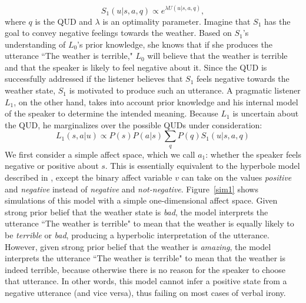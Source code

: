 \documentclass[10pt,letterpaper]{article}
\begin{document}
\begin{equation}
S_1(u | s, a, q) \propto e^{\lambda U(u | s, a, q)},
\end{equation}
where $q$ is the QUD and $\lambda$ is an optimality parameter.
%
Imagine that $S_1$ has the goal to convey negative feelings towards the weather. Based on $S_1$'s understanding of $L_0$'s prior knowledge, she knows that if she produces the utterance ``The weather is terrible," $L_0$ will believe that the weather is terrible and that the speaker is likely to feel negative about it. Since the QUD is successfully addressed if the listener believes that $S_1$ feels negative towards the weather state, $S_1$ is motivated to produce such an utterance.  A pragmatic listener $L_1$, on the other hand, takes into account prior knowledge and his internal model of the speaker to determine the intended meaning. Because $L_1$ is uncertain about the QUD, he marginalizes over the possible QUDs under consideration:
$$
L_1 (s, a | u) \propto P(s) P(a | s) \sum_{q}{P (q) S_1 (u|s, a, q)}
$$
%
We first consider a simple affect space, which we call $a_1$: whether the speaker feels negative or positive about $s$. This is essentially equivalent to the hyperbole model described in \cite{kao2014nonliteral}, except the binary affect variable $v$ can take on the values \emph{positive} and \emph{negative} instead of \emph{negative} and \emph{not-negative}.
%
%
Figure~\ref{sim1} shows simulations of this model with a simple one-dimensional affect space. Given strong prior belief that the weather state is \emph{bad}, the model interprets the utterance ``The weather is terrible" to mean that the weather is equally likely to be \emph{terrible} or \emph{bad}, producing a hyperbolic interpretation of the utterance. However, given strong prior belief that the weather is \emph{amazing}, the model interprets the utterance ``The weather is terrible" to mean that the weather is indeed terrible, because otherwise there is no reason for the speaker to choose that utterance. In other words, this model cannot infer a positive state from a negative utterance (and vice versa), thus failing on most cases of verbal irony. 
\end{document}
